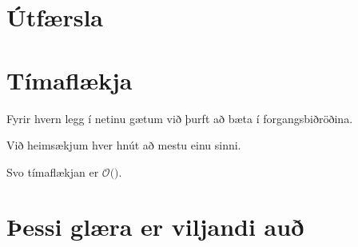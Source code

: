 \section{Útfærsla}
{
}

\section{Tímaflækja}
{
    {
        \item<1-> Fyrir hvern legg í netinu gætum við þurft að bæta í forgangsbiðröðina.
        \item<2-> Við heimsækjum hver hnút að mestu einu sinni.
        \item<3-> Svo tímaflækjan er $\mathcal{O}($$)$.
    }
}

\section{Þessi glæra er viljandi auð}
{
}


